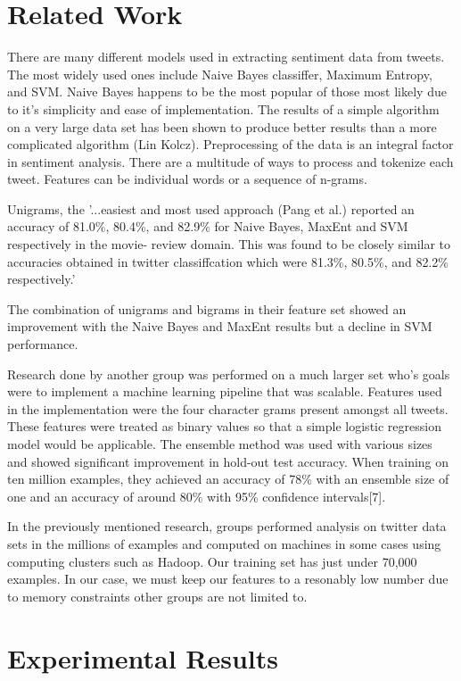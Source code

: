 \documentclass{article}
\begin{document}

\section{Related Work}
There are many different models used in extracting sentiment data from tweets. The most widely used ones include Naive Bayes classiffer, Maximum Entropy, and SVM. Naive Bayes happens to be the most popular of those most likely due to it's simplicity and ease of implementation. The results of a simple algorithm on a very large data set has been shown to produce better results than a more complicated algorithm (Lin Kolcz). Preprocessing of the data is an integral factor in sentiment analysis. There are a multitude of ways to process and tokenize each tweet. Features can be individual words or a sequence of n-grams. 

Unigrams, the '...easiest and most used approach (Pang et al.) reported an accuracy of 81.0\%, 80.4\%, and 82.9\% for Naive Bayes, MaxEnt and SVM respectively in the movie- review domain. This was found to be closely similar to accuracies obtained in twitter classiffcation which were 81.3\%, 80.5\%, and 82.2\% respectively.'

The combination of unigrams and bigrams in their feature set showed an improvement with the Naive Bayes and MaxEnt results but a decline in SVM performance. 

Research done by another group was performed on a much larger set who's goals were to implement a machine learning pipeline that was scalable. Features used in the implementation were the four character grams present amongst all tweets. These features were treated as binary values so that a simple logistic regression model would be applicable. The ensemble method was used with various sizes and showed significant improvement in hold-out test accuracy. When training on ten million examples, they achieved an accuracy of 78\% with an ensemble size of one and an accuracy of around 80\% with 95\% confidence intervals[7].

In the previously mentioned research, groups performed analysis on twitter data sets in the millions of examples and computed on machines in some cases using computing clusters such as Hadoop. Our training set has just under 70,000 examples. In our case, we must keep our features to a resonably low number due to memory constraints other groups are not limited to.

\section{Experimental Results}
\end{document}
